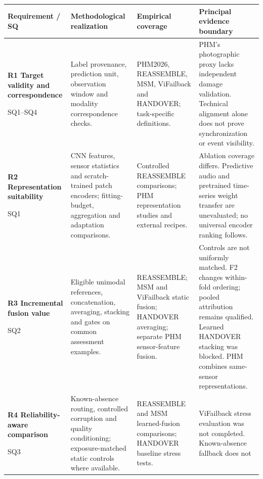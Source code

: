 \begingroup
\singlespacing
\fontsize{9bp}{11.5bp}\selectfont
\setlength{\tabcolsep}{4bp}
\renewcommand{\arraystretch}{1.12}
\begin{tabularx}{\linewidth}{@{}>{\raggedright\arraybackslash}p{73bp}>{\raggedright\arraybackslash}p{111bp}>{\raggedright\arraybackslash}p{100bp}>{\raggedright\arraybackslash}X@{}}
\toprule
\textbf{Requirement / SQ} & \textbf{Methodological realization} & \textbf{Empirical
coverage} & \textbf{Principal evidence boundary} \\
\midrule
\textbf{R1 Target validity and correspondence}\par SQ1--SQ4 &
Label provenance, prediction unit, observation window and modality correspondence checks. &
PHM2026, REASSEMBLE, MSM, ViFailback and HANDOVER; task-specific definitions. &
PHM's photographic proxy lacks independent damage validation. Technical alignment alone
does not prove synchronization or event visibility. \\
\addlinespace[7bp]
\textbf{R2 Representation suitability}\par SQ1 &
CNN features, sensor statistics and scratch-trained patch encoders; fitting-budget,
aggregation and adaptation comparisons. &
Controlled REASSEMBLE comparisons; PHM representation studies and external recipes. &
Ablation coverage differs. Predictive audio and pretrained time-series weight transfer
are unevaluated; no universal encoder ranking follows. \\
\addlinespace[7bp]
\textbf{R3 Incremental fusion value}\par SQ2 &
Eligible unimodal references, concatenation, averaging, stacking and gates on common
assessment examples. &
REASSEMBLE; MSM and ViFailback static fusion; HANDOVER averaging; separate PHM
sensor-feature fusion. &
Controls are not uniformly matched. F2 changes within-fold ordering; pooled attribution
remains qualified. Learned HANDOVER stacking was blocked. PHM combines same-sensor
representations. \\
\addlinespace[7bp]
\textbf{R4 Reliability-aware comparison}\par SQ3 &
Known-absence routing, controlled corruption and quality conditioning; exposure-matched
static controls where available. &
REASSEMBLE and MSM learned-fusion comparisons; HANDOVER baseline stress tests. &
ViFailback stress evaluation was not completed. Known-absence fallback does not

\end{tabularx}
